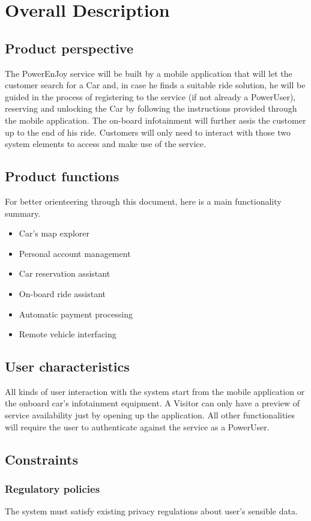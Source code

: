 \documentclass{article}
\begin{document}
\iffalse SECTION 2 \fi 
\section{Overall Description}
\subsection{Product perspective}
The PowerEnJoy service will be built by a mobile application that will let the customer search for a Car and, in case he finds a suitable ride solution, he will be guided in the process of registering to the service (if not already a PowerUser), reserving and unlocking the Car by following the instructions provided through the mobile application. The on-board infotainment will further assis the customer up to the end of his ride. Customers will only need to interact with those two system elements to access and make use of the service.
\subsection{Product functions}
For better orienteering through this document, here is a main functionality summary.
\begin{itemize}
\item Car's map explorer
\item Personal account management
\item Car reservation assistant
\item On-board ride assistant
\item Automatic payment processing
\item Remote vehicle interfacing
\end{itemize}
\subsection{User characteristics}
All kinds of user interaction with the system start from the mobile application or the onboard car's infotainment equipment. A Visitor can only have a preview of service availability just by opening up the application. All other functionalities will require the user to authenticate against the service as a PowerUser.
\subsection{Constraints}
\subsubsection{Regulatory policies}
The system must satisfy existing privacy regulations about user's sensible data.
\end{document}
